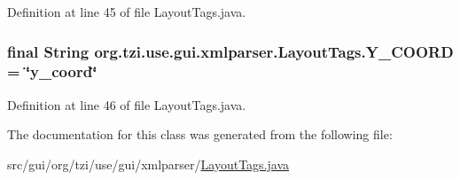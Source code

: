 Definition at line 45 of file Layout\-Tags.\-java.

\hypertarget{classorg_1_1tzi_1_1use_1_1gui_1_1xmlparser_1_1_layout_tags_a75db3b331a3ad361498d4667dfe91950}{
\subsubsection[{Y\-\_\-\-C\-O\-O\-R\-D}]{\setlength{\rightskip}{0pt plus 5cm}final String org.\-tzi.\-use.\-gui.\-xmlparser.\-Layout\-Tags.\-Y\-\_\-\-C\-O\-O\-R\-D = \char`\"{}y\-\_\-coord\char`\"{}\hspace{0.3cm}{\ttfamily [static]}}}\label{classorg_1_1tzi_1_1use_1_1gui_1_1xmlparser_1_1_layout_tags_a75db3b331a3ad361498d4667dfe91950}


Definition at line 46 of file Layout\-Tags.\-java.



The documentation for this class was generated from the following file\-:\begin{DoxyCompactItemize}
\item 
src/gui/org/tzi/use/gui/xmlparser/\hyperlink{_layout_tags_8java}{Layout\-Tags.\-java}\end{DoxyCompactItemize}
